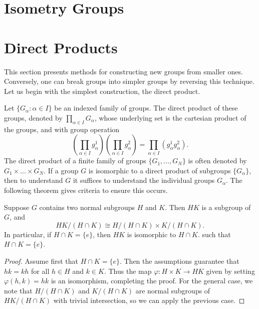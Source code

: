 \section{Isometry Groups}




\section{Direct Products}

This section presents methods for constructing new groups from smaller ones. Conversely, one can break groups into simpler groups by reversing this technique. Let us begin with the simplest construction, the direct product.

Let $\{ G_\alpha : \alpha \in I \}$ be an indexed family of groups. The direct product of these groups, denoted by $\prod_{\alpha \in I} G_\alpha$, whose underlying set is the cartesian product of the groups, and with group operation
%
\[ \left( \prod_{\alpha \in I} g^1_\alpha \right) \left( \prod_{\alpha \in I} g^2_\alpha \right) = \prod_{\alpha \in I} (g^1_\alpha g^2_\alpha). \]
%
The direct product of a finite family of groups $\{ G_1, \dots, G_N \}$ is often denoted by $G_1 \times \dots \times G_N$. If a group $G$ is isomorphic to a direct product of subgroups $\{ G_\alpha \}$, then to understand $G$ it suffices to understand the individual groups $G_\alpha$. The following theorem gives criteria to ensure this occurs.

\begin{theorem}
    Suppose $G$ contains two normal subgroups $H$ and $K$. Then $HK$ is a subgroup of $G$, and
    \[ HK/(H \cap K) \cong H/(H \cap K) \times K/(H \cap K). \]
    In particular, if $H \cap K = \{ e \}$, then $HK$ is isomorphic to $H \cap K$.
    such that $H \cap K = \{ e \}$. 
\end{theorem}
\begin{proof}
    Assume first that $H \cap K = \{ e \}$. Then the assumptions guarantee that $hk = kh$ for all $h \in H$ and $k \in K$. Thus the map $\varphi: H \times K \to HK$ given by setting $\varphi(h,k) = hk$ is an isomorphism, completing the proof. For the general case, we note that $H/(H \cap K)$ and $K/(H \cap K)$ are normal subgroups of $HK/(H \cap K)$ with trivial intersection, so we can apply the previous case.
\end{proof}

